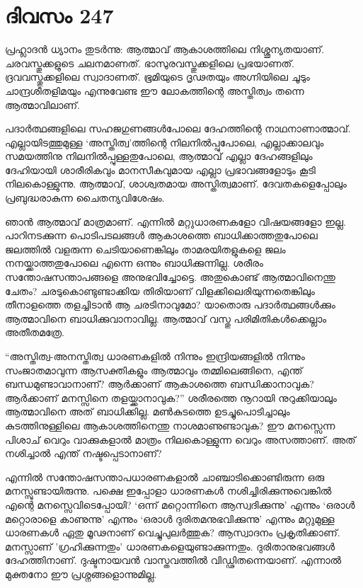 \section{ദിവസം 247}


പ്രഹ്ലാദന്‍ ധ്യാനം തുടര്‍ന്നു: ആത്മാവ് ആകാശത്തിലെ നിശ്ശൂന്യതയാണ്. ചരവസ്തുക്കളുടെ ചലനമാണത്. ഭാസുരവസ്തുക്കളിലെ പ്രഭയാണത്. ദ്രവവസ്തുക്കളിലെ സ്വാദാണത്. ഭൂമിയുടെ ദൃഢതയും അഗ്നിയിലെ ചൂടും ചാന്ദ്രശീതളിമയും എന്നുവേണ്ട ഈ ലോകത്തിന്റെ അസ്തിത്വം തന്നെ ആത്മാവിലാണ്. 

പദാര്‍ത്ഥങ്ങളിലെ സഹജഗുണങ്ങള്‍പോലെ ദേഹത്തിന്റെ നാഥനാണാത്മാവ്. എല്ലായിടത്തുമുള്ള ‘അസ്തിത്വ’ത്തിന്റെ നിലനില്‍പ്പുപോലെ, എല്ലാക്കാലവും സമയത്തിനു നിലനില്‍പ്പുള്ളതുപോലെ, ആത്മാവ് എല്ലാ ദേഹങ്ങളിലും ദേഹിയായി ശാരീരികവും മാനസീകവുമായ എല്ലാ പ്രഭാവങ്ങളോടും കൂടി നിലകൊള്ളുന്നു. ആത്മാവ്, ശാശ്വതമായ അസ്തിത്വമാണ്. ദേവതകളെപ്പോലും പ്രബുദ്ധരാകുന്ന ചൈതന്യവിശേഷം.

ഞാന്‍ ആത്മാവ് മാത്രമാണ്. എന്നില്‍ മറ്റുധാരണകളോ വിഷയങ്ങളോ ഇല്ല. പാറിനടക്കുന്ന പൊടിപടലങ്ങള്‍ ആകാശത്തെ ബാധിക്കാത്തതുപോലെ ജലത്തില്‍ വളരുന്ന ചെടിയാണെങ്കിലും താമരയിതളുകളെ ജലം നനയ്ക്കാത്തതുപോലെ എന്നെ ഒന്നും ബാധിക്കുന്നില്ല. ശരീരം സന്തോഷസന്താപങ്ങളെ അനുഭവിച്ചോട്ടെ. അതുകൊണ്ട് ആത്മാവിനെന്തു ചേതം? ചരടുകൊണ്ടുണ്ടാക്കിയ തിരിയാണ് വിളക്കിലെരിയുന്നതെങ്കിലും തീനാളത്തെ തളച്ചിടാന്‍ ആ ചരടിനാവുമോ? യാതൊരു പദാര്‍ത്ഥങ്ങള്‍ക്കും ആത്മാവിനെ ബാധിക്കുവാനാവില്ല. ആത്മാവ് വസ്തു പരിമിതികള്‍ക്കെല്ലാം  അതീതമത്രേ.
   
“അസ്തിത്വ-അനസ്തിത്വ ധാരണകളില്‍ നിന്നും ഇന്ദ്രിയങ്ങളില്‍ നിന്നും സംജാതമാവുന്ന ആസക്തികളും ആത്മാവും തമ്മിലെങ്ങിനെ, എന്ത്  ബന്ധമുണ്ടാവാനാണ്? ആര്‍ക്കാണ് ആകാശത്തെ ബന്ധിക്കാനാവുക? ആര്‍ക്കാണ് മനസ്സിനെ തളയ്ക്കാനാവുക?” ശരീരത്തെ നൂറായി നുറുക്കിയാലും ആത്മാവിനെ അത് ബാധിക്കില്ല. മണ്‍കുടത്തെ ഉടച്ചുപൊടിച്ചാലും കുടത്തിനുള്ളിലെ  ആകാശത്തിനെന്തു നാശമാണുണ്ടാവുക? ഈ മനസ്സെന്ന പിശാച് വെറും വാക്കുകളാല്‍ മാത്രം നിലകൊള്ളുന്ന വെറും അസത്താണ്. അത് നശിച്ചാല്‍ എന്ത് നഷ്ടപ്പെടാനാണ്?

എന്നില്‍ സന്തോഷസന്താപധാരണകളാല്‍ ചാഞ്ചാടിക്കൊണ്ടിരുന്ന ഒരു മനസ്സുണ്ടായിരുന്നു. പക്ഷെ ഇപ്പോളാ ധാരണകള്‍ നശിച്ചിരിക്കുന്നുവെങ്കില്‍ എന്റെ മനസ്സെവിടെപ്പോയി? ‘ഒന്ന് മറ്റൊന്നിനെ ആസ്വദിക്കുന്നു’ എന്നും ‘ഒരാള്‍ മറ്റൊരാളെ കാണുന്നു’ എന്നും ‘ഒരാള്‍ ദുരിതമനുഭവിക്കുന്നു’ എന്നും മറ്റുമുള്ള ധാരണകള്‍ ഏതു മൂഢനാണ് വെച്ചുപുലര്‍ത്തുക? ആസ്വാദനം പ്രകൃതിക്കാണ്. മനസ്സാണ് 'ഗ്രഹിക്കുന്നതും' ധാരണകളെയുണ്ടാക്കുന്നതും. ദുരിതാനുഭവങ്ങള്‍ ദേഹത്തിനാണ്. ദുഷ്ടനായവന്‍ വാസ്തവത്തില്‍ വിഡ്ഢിതന്നെയാണ്. എന്നാല്‍ മുക്തനോ ഈ പ്രശ്നങ്ങളൊന്നുമില്ല.

